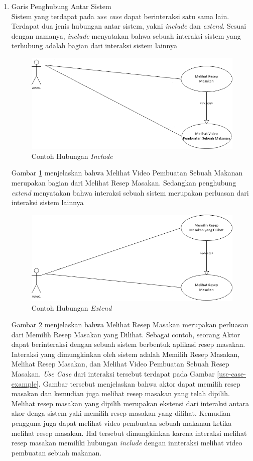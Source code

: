 \begin{enumerate}
			\item Garis Penghubung Antar Sistem\\ 
			Sistem yang terdapat pada \textit{use case} dapat berinteraksi satu sama lain. Terdapat dua jenis hubungan antar sistem, yakni \textit{include} dan \textit{extend}. Sesuai dengan namanya, \textit{include} menyatakan bahwa sebuah interaksi sistem yang terhubung adalah bagian dari interaksi sistem lainnya
			\begin{figure}[H]
				\centering
				\includegraphics[width=1\textwidth]{gambar/use-case/include}
				\caption{Contoh Hubungan \textit{Include}}
				\label{hub_include}
			\end{figure}
			Gambar \ref{hub_include} menjelaskan bahwa Melihat Video Pembuatan Sebuah Makanan merupakan bagian dari Melihat  Resep Masakan. Sedangkan penghubung \textit{extend} menyatakan bahwa interaksi sebuah sistem merupakan perluasan dari interaksi sistem lainnya
			\begin{figure}[H]
				\centering
				\includegraphics[width=1\textwidth]{gambar/use-case/extends}
				\caption{Contoh Hubungan \textit{Extend}}
				\label{hub_extend}
			\end{figure}
			Gambar \ref{hub_extend} menjelaskan bahwa Melihat Resep Masakan merupakan perluasan dari Memilih Resep Masakan yang Dilihat. Sebagai contoh, seorang Aktor dapat berinteraksi dengan sebuah sistem berbentuk aplikasi resep masakan. Interaksi yang dimungkinkan oleh sistem adalah Memilih Resep Masakan, Melihat Resep Masakan, dan Melihat Video Pembuatan Sebuah Resep Masakan. \textit{Use Case} dari interaksi tersebut terdapat pada Gambar \ref{use-case-example}. Gambar tersebut menjelaskan bahwa aktor dapat memilih resep masakan dan kemudian juga melihat resep masakan yang telah dipilih. Melihat resep masakan yang dipilih merupakan ekstensi dari interaksi antara akor denga sistem yaki memilih resep masakan yang dilihat. Kemudian pengguna juga dapat melihat video pembuatan sebuah makanan ketika melihat resep masakan. Hal tersebut dimungkinkan karena interaksi melihat resep masakan memiliki hubungan \textit{include} dengan innteraksi melihat video pembuatan sebuah makanan.

\end{enumerate}
